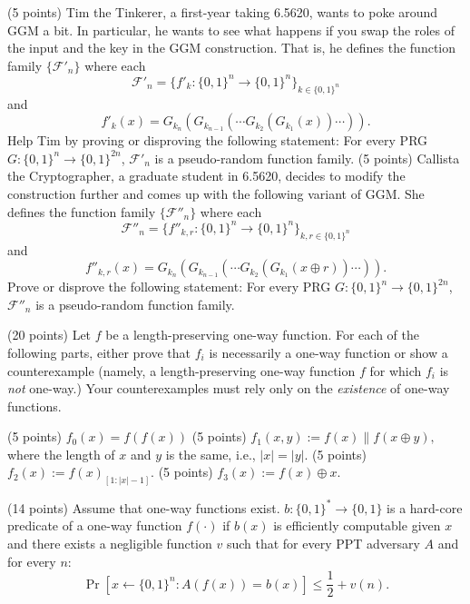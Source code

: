 \documentclass{article}
\newcommand{\secp}{n}
\begin{document}
\begin{problems}
\begin{problemparts}
\problempart (5 points) Tim the Tinkerer, a first-year taking 6.5620, wants to poke around GGM a bit. In particular, he wants to see what happens if you swap the roles of the input and the key in the GGM construction.
That is, he defines the function family $\{\mathcal{F}'_\secp\}$ where each 
$$ \mathcal{F}'_\secp = \{f'_k: \{0,1\}^\secp \to \{0,1\}^{\secp}\}_{k\in \{0,1\}^\secp}$$
and 
$$ f'_k(x) = G_{k_n}(G_{k_{n-1}}(\cdots G_{k_2}(G_{k_1}(x)) \cdots )).$$
Help Tim by proving or disproving the following statement: For every PRG $G: \{0,1\}^{n} \to \{0,1\}^{2n}$, $\mathcal{F}'_\secp$ is a pseudo-random function family. 
\problempart (5 points) Callista the Cryptographer, a graduate student in 6.5620,  decides to modify the construction further and comes up with the following variant of GGM. She defines the function family $\{\mathcal{F}''_\secp\}$ where each 
$$ \mathcal{F}''_\secp = \{f''_{k,r}: \{0,1\}^\secp \to \{0,1\}^{\secp}\}_{k,r\in \{0,1\}^\secp}$$
and 
$$ f''_{k,r}(x) = G_{k_n}(G_{k_{n-1}}(\cdots G_{k_2}(G_{k_1}(x\oplus r)) \cdots )).$$
Prove or disprove the following statement: For every PRG $G: \{0,1\}^{n} \to \{0,1\}^{2n}$, $\mathcal{F}''_\secp$ is a pseudo-random function family. 
\end{problemparts}




 (20 points) Let $f$ be a length-preserving one-way function. For each of the following parts, either prove that $f_i$ is necessarily a one-way function or show a counterexample (namely, a length-preserving one-way function $f$ for which $f_i$ is {\em not} one-way.) Your counterexamples must rely only on the {\em existence} of one-way functions. 

\begin{problemparts}
\problempart (5 points) $f_0(x) = f(f(x))$
\problempart (5 points) $f_1(x,y) := f(x) \| f(x \oplus y),$ where the length of $x$ and $y$ is the same, i.e., $|x| = |y|$.
\problempart (5 points) $f_2(x) := f(x)_{[1:|x|-1]}$. 
\problempart (5 points) $f_3(x) := f(x)\oplus x$. 
\end{problemparts}


 (14 points) Assume that one-way functions exist.  $b: \{0,1\}^* \to \{0,1\}$ is a hard-core predicate of a one-way function $f(\cdot)$ if $b(x)$ is efficiently computable given $x$ and there exists a negligible function $v$ such that for every PPT adversary $A$ and for every $n$:
$$ \Pr[x \gets \{0,1\}^n: A(f(x)) = b(x) ] \leq \frac{1}{2} + v(n). $$


\end{problems}
\end{document}
